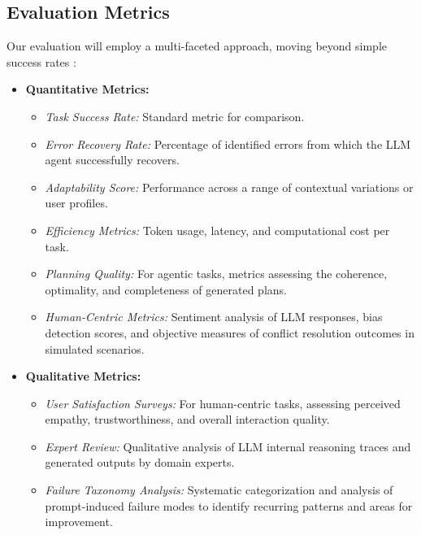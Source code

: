 \documentclass{article}
\begin{document}
\subsection{Evaluation Metrics}
Our evaluation will employ a multi-faceted approach, moving beyond simple success rates \cite{PaperOne}:
\begin{itemize}
    \item \textbf{Quantitative Metrics:}
    \begin{itemize}
        \item \textit{Task Success Rate:} Standard metric for comparison.
        \item \textit{Error Recovery Rate:} Percentage of identified errors from which the LLM agent successfully recovers.
        \item \textit{Adaptability Score:} Performance across a range of contextual variations or user profiles.
        \item \textit{Efficiency Metrics:} Token usage, latency, and computational cost per task.
        \item \textit{Planning Quality:} For agentic tasks, metrics assessing the coherence, optimality, and completeness of generated plans.
        \item \textit{Human-Centric Metrics:} Sentiment analysis of LLM responses, bias detection scores, and objective measures of conflict resolution outcomes in simulated scenarios.
    \end{itemize}
    \item \textbf{Qualitative Metrics:}
    \begin{itemize}
        \item \textit{User Satisfaction Surveys:} For human-centric tasks, assessing perceived empathy, trustworthiness, and overall interaction quality.
        \item \textit{Expert Review:} Qualitative analysis of LLM internal reasoning traces and generated outputs by domain experts.
        \item \textit{Failure Taxonomy Analysis:} Systematic categorization and analysis of prompt-induced failure modes to identify recurring patterns and areas for improvement.
    \end{itemize}
\end{itemize}
\end{document}
